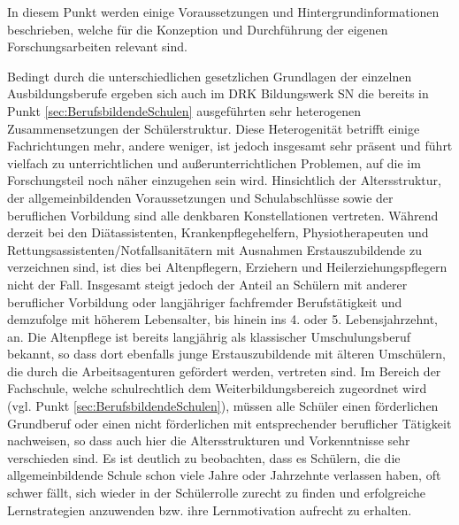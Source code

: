 In diesem Punkt werden einige Voraussetzungen und Hintergrundinformationen beschrieben, welche für die Konzeption und Durchführung der eigenen Forschungsarbeiten relevant sind. 

Bedingt durch die unterschiedlichen gesetzlichen Grundlagen der einzelnen Ausbildungsberufe ergeben sich auch im DRK Bildungswerk SN die bereits in Punkt \ref{sec:BerufsbildendeSchulen} ausgeführten sehr heterogenen Zusammensetzungen der Schülerstruktur. Diese Heterogenität betrifft einige Fachrichtungen mehr, andere weniger, ist jedoch insgesamt sehr präsent und führt vielfach zu unterrichtlichen und außerunterrichtlichen Problemen, auf die im Forschungsteil noch näher einzugehen sein wird. Hinsichtlich der Altersstruktur, der allgemeinbildenden Voraussetzungen und Schulabschlüsse sowie der beruflichen Vorbildung sind alle denkbaren Konstellationen vertreten. Während derzeit bei den Diätassistenten, Krankenpflegehelfern, Physiotherapeuten und Rettungsassistenten/Notfallsanitätern mit Ausnahmen Erstauszubildende zu verzeichnen sind, ist dies bei Altenpflegern, Erziehern und Heilerziehungspflegern nicht der Fall. Insgesamt steigt jedoch der Anteil an Schülern mit anderer beruflicher Vorbildung oder langjähriger fachfremder Berufstätigkeit und demzufolge mit höherem Lebensalter, bis hinein ins 4. oder 5. Lebensjahrzehnt, an. Die Altenpflege ist bereits langjährig als klassischer Umschulungsberuf bekannt, so dass dort ebenfalls junge Erstauszubildende mit älteren Umschülern, die durch die Arbeitsagenturen gefördert werden, vertreten sind. Im Bereich der Fachschule, welche schulrechtlich dem Weiterbildungsbereich zugeordnet wird (vgl. Punkt \ref{sec:BerufsbildendeSchulen}), müssen alle Schüler einen förderlichen Grundberuf oder einen nicht förderlichen mit entsprechender beruflicher Tätigkeit nachweisen, so dass auch hier die Altersstrukturen und Vorkenntnisse sehr verschieden sind. Es ist deutlich zu beobachten, dass es Schülern, die die allgemeinbildende Schule schon viele Jahre oder Jahrzehnte verlassen haben, oft schwer fällt, sich wieder in der Schülerrolle zurecht zu finden und erfolgreiche Lernstrategien anzuwenden bzw. ihre Lernmotivation aufrecht zu erhalten.

